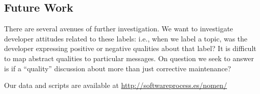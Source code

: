 \documentclass[]{sig-alternate}
\begin{document}
  
\subsection{Future Work}
 
There are several avenues of further investigation.  
We want to investigate developer attitudes related to these labels: i.e., when we label a topic, was the developer expressing positive or negative qualities about that label?  
It is difficult to map abstract qualities to particular messages. %
On question we seek to answer is if a ``quality'' discussion about more than just corrective maintenance? %
 







\appendix

Our data and scripts are available at \url{http://softwareprocess.es/nomen/}


%

\end{document}
